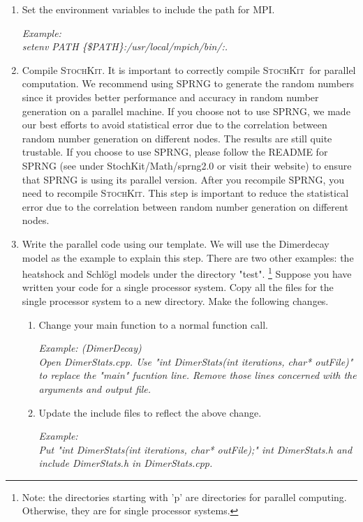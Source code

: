 \documentclass[12pt]{article}
\newcommand{\sspack}{\textsc{StochKit}}
\begin{document}
\begin{enumerate}
\item Set the environment variables to include the path for MPI.

{\it
Example: \\
setenv PATH \{\$PATH\}:/usr/local/mpich/bin/:.
}

\item  Compile \sspack. It is important to correctly compile \sspack \ for parallel computation.
We recommend using SPRNG to generate the random numbers
since it provides better performance and accuracy in random number generation on a parallel
machine. If you choose not to use SPRNG, we made our best efforts to avoid statistical error
due to the correlation between random number generation on different nodes. The results are still
quite trustable. If you choose to use SPRNG, please follow the README for SPRNG
(see under StochKit/Math/sprng2.0 or visit their website) to ensure that SPRNG is using its parallel
version. After you recompile SPRNG, you need to recompile \sspack. This step is important
to reduce the statistical error due to the correlation between random number generation
on different nodes.

\item Write the parallel code using our template. We will use the Dimerdecay model
as the example to explain this step. There are two other examples: the heatshock and Schl\"ogl
models under the directory "test". \footnote{Note: the directories starting with 'p'
are directories for parallel computing. Otherwise, they are for single processor systems.}
Suppose you have written your code for a single processor system. Copy all the files
for the single processor system to a new directory. Make the following changes.
\begin{enumerate}
\item Change your main function to a normal function call.

{\it
Example: (DimerDecay) \\
Open DimerStats.cpp.
Use "int DimerStats(int iterations, char* outFile)" to replace
the "main" fucntion line. Remove those lines concerned with the arguments and output file.
}

\item Update the include files to reflect the above change.

{\it
Example: \\
Put "int DimerStats(int iterations, char* outFile);" int DimerStats.h and
include DimerStats.h in DimerStats.cpp.
}


\end{enumerate}
\end{enumerate}
\end{document}

